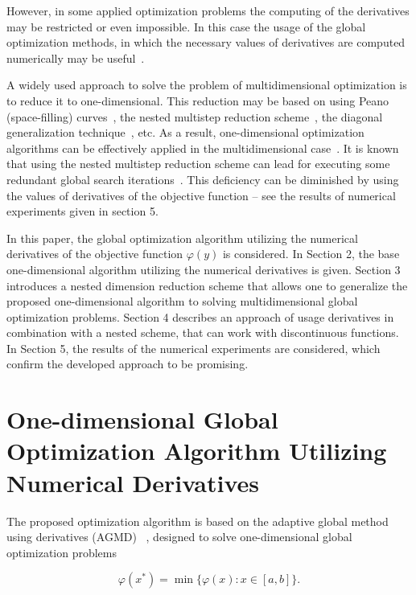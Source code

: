 \documentclass[runningheads]{llncs}
\begin{document}
However, in some applied optimization problems the computing of the derivatives may be restricted or even impossible. In this case the usage of the global optimization methods, in which the necessary values of derivatives are computed numerically may be useful~\cite{Gergel2017,Goryachih2017,Griewank2008,Nocedal2006}.

A widely used approach to solve the problem of multidimensional optimization is to reduce it to one-dimensional. This reduction may be based on using Peano (space-filling) curves~\cite{Piyavskij2006,Strongin2000}, the nested multistep reduction scheme~\cite{Dam2010,Shi2000}, the diagonal generalization technique~\cite{Gergel1997,Pinter1996,Sergeyev2015}, etc. As a result, one-dimensional optimization algorithms can be effectively applied in the multidimensional case~\cite{Baritompa1994,Breiman1993,Dam2010,Galperin1985,Gergel1996,Gergel2017}. It is known that using the nested multistep reduction scheme can lead for executing some redundant global search iterations~\cite{Dam2010,Shi2000,Strongin2000}. This deficiency can be diminished by using the values of derivatives of the objective function -- see the results of numerical experiments given in section 5.

In this paper, the global optimization algorithm utilizing the numerical derivatives of the objective function $\varphi(y)$ is considered. In Section 2, the base one-dimensional algorithm utilizing the numerical derivatives is given. Section 3 introduces a nested dimension reduction scheme that allows one to generalize the proposed one-dimensional algorithm to solving multidimensional global optimization problems. Section 4 describes an approach of usage derivatives in combination with a nested scheme, that can work with discontinuous functions. In Section 5, the results of the numerical experiments are considered, which confirm the developed approach to be promising.

\section{One-dimensional Global Optimization Algorithm Utilizing Numerical	Derivatives}\label{sec:GOAND}

The proposed optimization algorithm is based on the adaptive global method using derivatives (AGMD) ~\cite{Gergel1996,Gergel1997}, designed to solve one-dimensional global optimization problems

\begin{equation}
\label{eq:problem_statement_1d}
\varphi(x^*) = \min\{\varphi(x)\colon x \in [a,b]\}.
\end{equation} 
\end{document}
